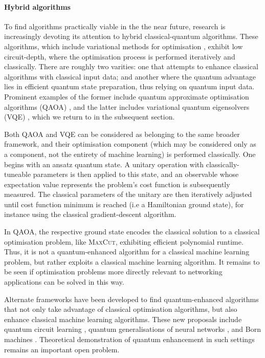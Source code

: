 \paragraph{Hybrid algorithms}

To find algorithms practically viable in the the near future, research is increasingly devoting its attention to hybrid classical-quantum algorithms. These algorithms, which include variational methods for optimisation \cite{bib:moll2018quantum}, exhibit low circuit-depth, where the optimisation process is performed iteratively and classically. There are roughly two varities: one that attempts to enhance classical algorithms with classical input data; and another where the quantum advantage lies in efficient quantum state preparation, thus relying on quantum input data. Prominent examples of the former include quantum approximate optimisation algorithms (QAOA) \cite{bib:farhi2014quantum, bib:farhi2016quantum}, and the latter includes variational quantum eigensolvers (VQE) \cite{bib:peruzzo2014peruzzo, bib:kandala2017hardware}, which we return to in the subsequent section.

Both QAOA and VQE can be considered as belonging to the same broader framework, and their optimisation component (which may be considered only as a component, not the entirety of machine learning) is performed classically. One begins with an ansatz quantum state. A unitary operation with classically-tuneable parameters is then applied to this state, and an observable whose expectation value represents the problem's cost function is subsequently measured. The classical parameters of the unitary are then iteratively adjusted until cost function minimum is reached (i.e a Hamiltonian ground state), for instance using the classical gradient-descent algorithm.

In QAOA, the respective ground state encodes the classical solution to a classical optimisation problem, like \textsc{MaxCut}, exhibiting efficient polynomial runtime. Thus, it is not a quantum-enhanced algorithm for a classical machine learning problem, but rather exploits a classical machine learning algorithm. It remains to be seen if optimisation problems more directly relevant to networking applications can be solved in this way.

Alternate frameworks have been developed to find quantum-enhanced algorithms that not only take advantage of classical optimisation algorithms, but also enhance classical machine learning algorithms. These new proposals include quantum circuit learning \cite{bib:mitarai2018quantum}, quantum generalisations of neural networks \cite{wan2017quantum}, and Born machines \cite{bib:cheng2018information, bib:benedetti2018generative}. Theoretical demonstration of quantum enhancement in such settings remains an important open problem.

